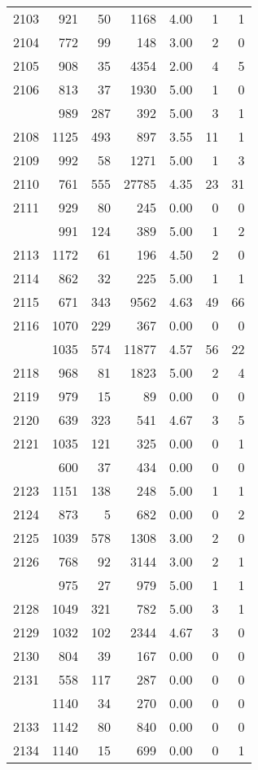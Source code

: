 \documentclass[
]{article}
\begin{document}
\begin{table}
\begin{tabular}[t]{lrrrrrr}
2103 & 921 & 50 & 1168 & 4.00 & 1 & 1\\
2104 & 772 & 99 & 148 & 3.00 & 2 & 0\\
2105 & 908 & 35 & 4354 & 2.00 & 4 & 5\\
2106 & 813 & 37 & 1930 & 5.00 & 1 & 0\\
\addlinespace
2107 & 989 & 287 & 392 & 5.00 & 3 & 1\\
2108 & 1125 & 493 & 897 & 3.55 & 11 & 1\\
2109 & 992 & 58 & 1271 & 5.00 & 1 & 3\\
2110 & 761 & 555 & 27785 & 4.35 & 23 & 31\\
2111 & 929 & 80 & 245 & 0.00 & 0 & 0\\
\addlinespace
2112 & 991 & 124 & 389 & 5.00 & 1 & 2\\
2113 & 1172 & 61 & 196 & 4.50 & 2 & 0\\
2114 & 862 & 32 & 225 & 5.00 & 1 & 1\\
2115 & 671 & 343 & 9562 & 4.63 & 49 & 66\\
2116 & 1070 & 229 & 367 & 0.00 & 0 & 0\\
\addlinespace
2117 & 1035 & 574 & 11877 & 4.57 & 56 & 22\\
2118 & 968 & 81 & 1823 & 5.00 & 2 & 4\\
2119 & 979 & 15 & 89 & 0.00 & 0 & 0\\
2120 & 639 & 323 & 541 & 4.67 & 3 & 5\\
2121 & 1035 & 121 & 325 & 0.00 & 0 & 1\\
\addlinespace
2122 & 600 & 37 & 434 & 0.00 & 0 & 0\\
2123 & 1151 & 138 & 248 & 5.00 & 1 & 1\\
2124 & 873 & 5 & 682 & 0.00 & 0 & 2\\
2125 & 1039 & 578 & 1308 & 3.00 & 2 & 0\\
2126 & 768 & 92 & 3144 & 3.00 & 2 & 1\\
\addlinespace
2127 & 975 & 27 & 979 & 5.00 & 1 & 1\\
2128 & 1049 & 321 & 782 & 5.00 & 3 & 1\\
2129 & 1032 & 102 & 2344 & 4.67 & 3 & 0\\
2130 & 804 & 39 & 167 & 0.00 & 0 & 0\\
2131 & 558 & 117 & 287 & 0.00 & 0 & 0\\
\addlinespace
2132 & 1140 & 34 & 270 & 0.00 & 0 & 0\\
2133 & 1142 & 80 & 840 & 0.00 & 0 & 0\\
2134 & 1140 & 15 & 699 & 0.00 & 0 & 1\\

\end{tabular}
\end{table}
\end{document}
